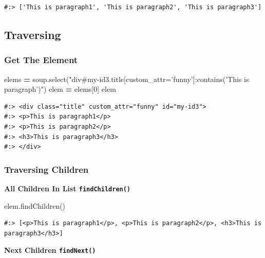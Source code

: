 \documentclass[
]{book}
\newenvironment{Shaded}{\begin{snugshade}}{\end{snugshade}}
\newcommand{\DecValTok}[1]{\textcolor[rgb]{0.06,0.06,0.06}{#1}}
\newcommand{\NormalTok}[1]{#1}
\newcommand{\OperatorTok}[1]{\textcolor[rgb]{0.43,0.43,0.43}{\textbf{#1}}}
\newcommand{\StringTok}[1]{\textcolor[rgb]{0.5,0.5,0.5}{#1}}
\begin{document}
\begin{verbatim}
#:> ['This is paragraph1', 'This is paragraph2', 'This is paragraph3']
\end{verbatim}

\hypertarget{traversing}{%
\subsection{Traversing}\label{traversing}}

\hypertarget{get-the-element}{%
\subsubsection{Get The Element}\label{get-the-element}}

\begin{Shaded}
\begin{Highlighting}[]
\NormalTok{elems }\OperatorTok{=}\NormalTok{ soup.select(}\StringTok{"div#my-id3.title[custom_attr='funny']:contains('This is paragraph')"}\NormalTok{)}
\NormalTok{elem }\OperatorTok{=}\NormalTok{ elems[}\DecValTok{0}\NormalTok{]}
\NormalTok{elem}
\end{Highlighting}
\end{Shaded}

\begin{verbatim}
#:> <div class="title" custom_attr="funny" id="my-id3">
#:> <p>This is paragraph1</p>
#:> <p>This is paragraph2</p>
#:> <h3>This is paragraph3</h3>
#:> </div>
\end{verbatim}

\hypertarget{traversing-children}{%
\subsubsection{Traversing Children}\label{traversing-children}}

\textbf{All Children In List \texttt{findChildren()}}

\begin{Shaded}
\begin{Highlighting}[]
\NormalTok{elem.findChildren()}
\end{Highlighting}
\end{Shaded}

\begin{verbatim}
#:> [<p>This is paragraph1</p>, <p>This is paragraph2</p>, <h3>This is paragraph3</h3>]
\end{verbatim}

\textbf{Next Children \texttt{findNext()}}
\end{document}
